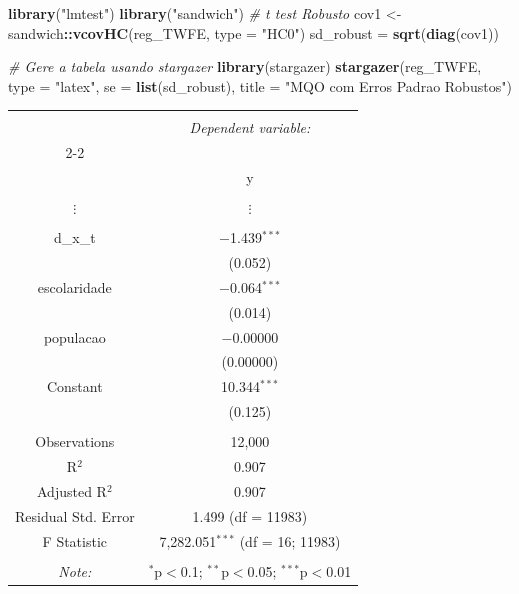 \documentclass[portugues]{article}
\newenvironment{Shaded}{\begin{snugshade}}{\end{snugshade}}
\newcommand{\AttributeTok}[1]{\textcolor[rgb]{0.13,0.29,0.53}{#1}}
\newcommand{\CommentTok}[1]{\textcolor[rgb]{0.56,0.35,0.01}{\textit{#1}}}
\newcommand{\FunctionTok}[1]{\textcolor[rgb]{0.13,0.29,0.53}{\textbf{#1}}}
\newcommand{\NormalTok}[1]{#1}
\newcommand{\OtherTok}[1]{\textcolor[rgb]{0.56,0.35,0.01}{#1}}
\newcommand{\SpecialCharTok}[1]{\textcolor[rgb]{0.81,0.36,0.00}{\textbf{#1}}}
\newcommand{\StringTok}[1]{\textcolor[rgb]{0.31,0.60,0.02}{#1}}
\begin{document}
\begin{boxA}
\begin{Shaded}
\begin{Highlighting}[]
\FunctionTok{library}\NormalTok{(}\StringTok{"lmtest"}\NormalTok{)}
\FunctionTok{library}\NormalTok{(}\StringTok{"sandwich"}\NormalTok{)}
\CommentTok{\# t test Robusto}
\NormalTok{cov1 }\OtherTok{\textless{}{-}}\NormalTok{ sandwich}\SpecialCharTok{::}\FunctionTok{vcovHC}\NormalTok{(reg\_TWFE, }\AttributeTok{type =} \StringTok{"HC0"}\NormalTok{)}
\NormalTok{sd\_robust }\OtherTok{=} \FunctionTok{sqrt}\NormalTok{(}\FunctionTok{diag}\NormalTok{(cov1))}

\CommentTok{\# Gere a tabela usando stargazer}
\FunctionTok{library}\NormalTok{(stargazer)}
\FunctionTok{stargazer}\NormalTok{(reg\_TWFE, }\AttributeTok{type =} \StringTok{"latex"}\NormalTok{, }\AttributeTok{se =} \FunctionTok{list}\NormalTok{(sd\_robust),}
\AttributeTok{title =} \StringTok{"MQO com Erros Padrao Robustos"}\NormalTok{)}
\end{Highlighting}
\end{Shaded}

    \begingroup
        \fontsize{8pt}{12pt}\selectfont
        \begin{center}
         \begin{tabular}{@{\extracolsep{5pt}}cc} 
         \\[-1.8ex]\hline 
         \hline \\[-1.8ex] 
          & \multicolumn{1}{c}{\textit{Dependent variable:}} \\ 
         \cline{2-2} 
         \\[-1.8ex] & y \\ 
         \hline \\[-1.8ex] 
            $\vdots$ & $\vdots$ \\
            & \\
        d\_x\_t & $-$1.439$^{***}$ \\ 
          & (0.052) \\ 
          escolaridade & $-$0.064$^{***}$ \\ 
          & (0.014) \\ 
          populacao & $-$0.00000 \\ 
          & (0.00000) \\ 
          Constant & 10.344$^{***}$ \\ 
          & (0.125) \\ 
         \hline \\[-1.8ex] 
         Observations & 12,000 \\ 
         R$^{2}$ & 0.907 \\ 
         Adjusted R$^{2}$ & 0.907 \\ 
         Residual Std. Error & 1.499 (df = 11983) \\ 
         F Statistic & 7,282.051$^{***}$ (df = 16; 11983) \\ 
         \hline 
         \hline \\[-1.8ex] 
         \textit{Note:}  & \multicolumn{1}{r}{$^{*}$p$<$0.1; $^{**}$p$<$0.05; $^{***}$p$<$0.01} \\ 
        

\end{tabular}
\end{center}
\end{boxA}
\end{document}
